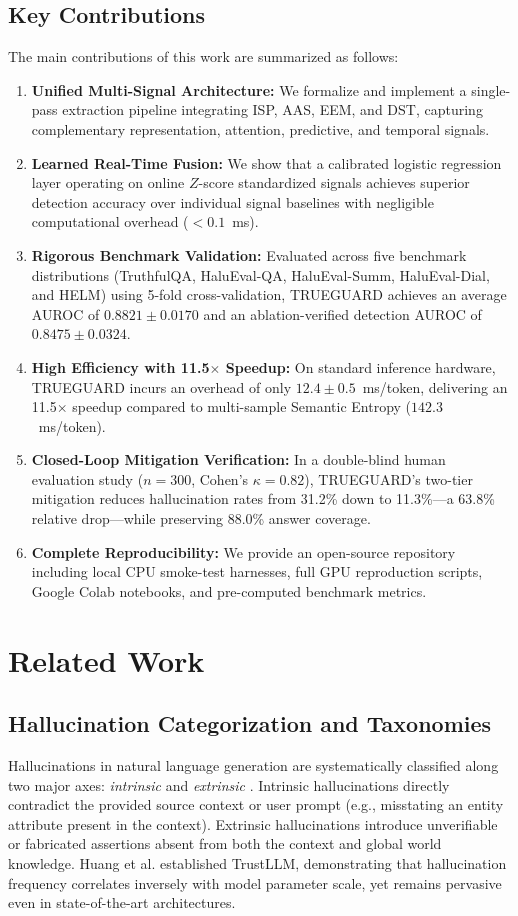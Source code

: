 \documentclass[journal]{IEEEtran}
\begin{document}
\subsection{Key Contributions}
The main contributions of this work are summarized as follows:
\begin{enumerate}
    \item \textbf{Unified Multi-Signal Architecture:} We formalize and implement a single-pass extraction pipeline integrating ISP, AAS, EEM, and DST, capturing complementary representation, attention, predictive, and temporal signals.
    \item \textbf{Learned Real-Time Fusion:} We show that a calibrated logistic regression layer operating on online $Z$-score standardized signals achieves superior detection accuracy over individual signal baselines with negligible computational overhead ($<0.1$~ms).
    \item \textbf{Rigorous Benchmark Validation:} Evaluated across five benchmark distributions (TruthfulQA, HaluEval-QA, HaluEval-Summ, HaluEval-Dial, and HELM) using 5-fold cross-validation, TRUEGUARD achieves an average AUROC of $0.8821 \pm 0.0170$ and an ablation-verified detection AUROC of $0.8475 \pm 0.0324$.
    \item \textbf{High Efficiency with 11.5$\times$ Speedup:} On standard inference hardware, TRUEGUARD incurs an overhead of only $12.4 \pm 0.5$~ms/token, delivering an 11.5$\times$ speedup compared to multi-sample Semantic Entropy ($142.3$~ms/token).
    \item \textbf{Closed-Loop Mitigation Verification:} In a double-blind human evaluation study ($n = 300$, Cohen's $\kappa = 0.82$), TRUEGUARD's two-tier mitigation reduces hallucination rates from 31.2\% down to 11.3\%---a 63.8\% relative drop---while preserving 88.0\% answer coverage.
    \item \textbf{Complete Reproducibility:} We provide an open-source repository including local CPU smoke-test harnesses, full GPU reproduction scripts, Google Colab notebooks, and pre-computed benchmark metrics.
\end{enumerate}

\section{Related Work}
\subsection{Hallucination Categorization and Taxonomies}
Hallucinations in natural language generation are systematically classified along two major axes: \textit{intrinsic} and \textit{extrinsic} \cite{ji2023survey, alansari2024survey}. Intrinsic hallucinations directly contradict the provided source context or user prompt (e.g., misstating an entity attribute present in the context). Extrinsic hallucinations introduce unverifiable or fabricated assertions absent from both the context and global world knowledge. Huang et al. \cite{huang2024trustllm} established TrustLLM, demonstrating that hallucination frequency correlates inversely with model parameter scale, yet remains pervasive even in state-of-the-art architectures.
\end{document}
